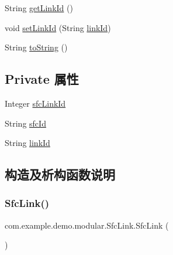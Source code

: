 \begin{DoxyCompactItemize}
\item 
String \mbox{\hyperlink{classcom_1_1example_1_1demo_1_1modular_1_1_sfc_link_abef1454b2010f7a4edd8ee61afbe6f1c}{get\+Link\+Id}} ()
\item 
void \mbox{\hyperlink{classcom_1_1example_1_1demo_1_1modular_1_1_sfc_link_a4c16cac5cfddb2a3c7853942a3d3a57b}{set\+Link\+Id}} (String \mbox{\hyperlink{classcom_1_1example_1_1demo_1_1modular_1_1_sfc_link_a031499b601fbf3abddd7faef4934ba02}{link\+Id}})
\item 
String \mbox{\hyperlink{classcom_1_1example_1_1demo_1_1modular_1_1_sfc_link_ab2f0828056c1b154682e2b3ea1c2204b}{to\+String}} ()
\end{DoxyCompactItemize}
\subsection*{Private 属性}
\begin{DoxyCompactItemize}
\item 
Integer \mbox{\hyperlink{classcom_1_1example_1_1demo_1_1modular_1_1_sfc_link_a9892796c1822cec476ad963ec8cc7a23}{sfc\+Link\+Id}}
\item 
String \mbox{\hyperlink{classcom_1_1example_1_1demo_1_1modular_1_1_sfc_link_a65b01ef9a84d86e0f1d6ccefe66cb69c}{sfc\+Id}}
\item 
String \mbox{\hyperlink{classcom_1_1example_1_1demo_1_1modular_1_1_sfc_link_a031499b601fbf3abddd7faef4934ba02}{link\+Id}}
\end{DoxyCompactItemize}


\subsection{构造及析构函数说明}
\mbox{\label{classcom_1_1example_1_1demo_1_1modular_1_1_sfc_link_abc1797f91870a2a0720ffb1235352599}} 
\subsubsection{\texorpdfstring{Sfc\+Link()}{SfcLink()}\hspace{0.1cm}{\footnotesize\ttfamily [1/3]}}
{\footnotesize\ttfamily com.\+example.\+demo.\+modular.\+Sfc\+Link.\+Sfc\+Link (\begin{DoxyParamCaption}{ }\end{DoxyParamCaption})}

